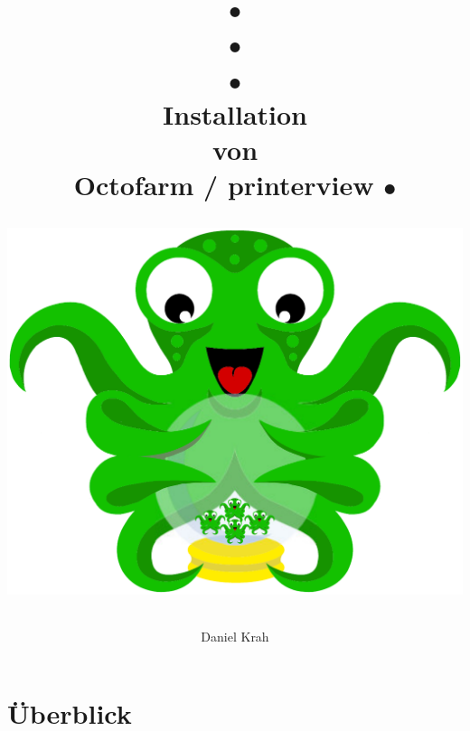 \documentclass{article}
\title{
\color{white}
 $\bullet$ \\ $\bullet$ \\ $\bullet$ \\
 \color{black}
 \color{black}
Installation \\
von \\
Octofarm / printerview
\color{white}
$\bullet$ \\
\color{black}
 \begin{center}
	\includegraphics[scale=0.5]{./pictures/octofarm.pdf}
\end{center}
}
\author{Daniel Krah}
\begin{document}
\maketitle%
\newpage%
 \tableofcontents%

\AddToShipoutPicture{\BackgroundPic}
\newpage
\section{Überblick}



%
\end{document}
